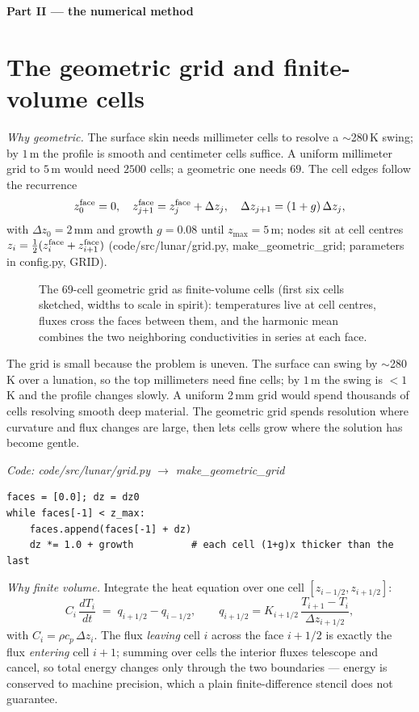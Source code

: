 \documentclass[11pt]{report}
\newcommand{\code}[1]{{\ttfamily\small #1}}
\begin{document}
\bigskip
\noindent\textbf{\textsf{\color{forest} Part II --- the numerical method}}

\section{The geometric grid and finite-volume cells}\label{app:grid}
\emph{Why geometric.} The surface skin needs millimeter cells to resolve a
$\sim$280\,K swing; by $1$\,m the profile is smooth and centimeter cells suffice.
A uniform millimeter grid to $5$\,m would need $2500$ cells; a geometric one
needs $69$. The cell edges follow the recurrence
\[
z_0^{\rm face}=0,\quad z_{j+1}^{\rm face}=z_j^{\rm face}+\Delta z_j,\quad
\Delta z_{j+1}=(1+g)\,\Delta z_j,
\]
with $\Delta z_0=2$\,mm and growth $g=0.08$ until $z_{\max}=5$\,m; nodes sit at
cell centres $z_i=\tfrac12(z_i^{\rm face}+z_{i+1}^{\rm face})$
(\code{code/src/lunar/grid.py}, \code{make\_geometric\_grid}; parameters in
\code{config.py}, \code{GRID}).

\begin{figure}[htbp]\centering

\caption{The 69-cell geometric grid as finite-volume cells (first six cells
sketched, widths to scale in spirit): temperatures live at cell centres,
fluxes cross the faces between them, and the harmonic mean combines the two
neighboring conductivities in series at each face.}
\label{fig:gridcells}
\end{figure}


\begin{plain}
The grid is small because the problem is uneven. The surface can swing by
$\sim$280\,K over a lunation, so the top millimeters need fine cells; by
$1$\,m the swing is $<1$\,K and the profile changes slowly. A uniform 2\,mm grid
would spend thousands of cells resolving smooth deep material. The geometric
grid spends resolution where curvature and flux changes are large, then lets
cells grow where the solution has become gentle.
\end{plain}

{\small\color{dim}\textit{Code: \code{code/src/lunar/grid.py} $\to$ \code{make\_geometric\_grid}}}
\begin{lstlisting}[style=py]
faces = [0.0]; dz = dz0
while faces[-1] < z_max:
    faces.append(faces[-1] + dz)
    dz *= 1.0 + growth          # each cell (1+g)x thicker than the last
\end{lstlisting}

\emph{Why finite volume.} Integrate the heat equation over one cell
$[z_{i-1/2},z_{i+1/2}]$:
\[
C_i\,\frac{dT_i}{dt} \;=\; q_{i+1/2}-q_{i-1/2},\qquad
q_{i+1/2}=K_{i+1/2}\,\frac{T_{i+1}-T_i}{\Delta z_{i+1/2}},
\]
with $C_i=\rho c_p\,\Delta z_i$. The flux \emph{leaving} cell $i$ across the face
$i{+}1/2$ is exactly the flux \emph{entering} cell $i{+}1$; summing over cells the
interior fluxes telescope and cancel, so total energy changes only through the
two boundaries --- energy is conserved to machine precision, which a plain
finite-difference stencil does not guarantee.
\end{document}
